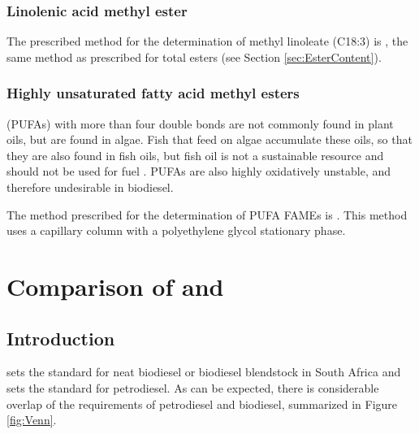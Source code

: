 \subsubsection{Linolenic acid methyl ester}

The prescribed method for the determination of methyl linoleate (C18:3) is
, the same method as prescribed for total esters (see Section
\ref{sec:EsterContent}).

\subsubsection{Highly unsaturated fatty acid methyl esters}

 (PUFAs) with more than four double bonds are
not commonly found in plant oils, but are found in algae. Fish that feed on
algae accumulate these oils, so that they are also found in fish oils, but fish
oil is not a sustainable resource and should not be used for fuel
\autocite{Kitessa2014}. PUFAs are also highly oxidatively unstable, and
therefore undesirable in biodiesel.

The method prescribed for the determination of PUFA FAMEs is .
This method uses a capillary column with a polyethylene glycol stationary phase.

\section{Comparison of \texorpdfstring{}{SANS 1935} and \texorpdfstring{}{SANS 342}}

\subsection{Introduction}
\label{sec:Comparison}

 sets the standard for neat biodiesel or biodiesel blendstock in
South Africa and  sets the standard for petrodiesel. As can be
expected, there is considerable overlap of the requirements of petrodiesel and
biodiesel, summarized in Figure \ref{fig:Venn}.

